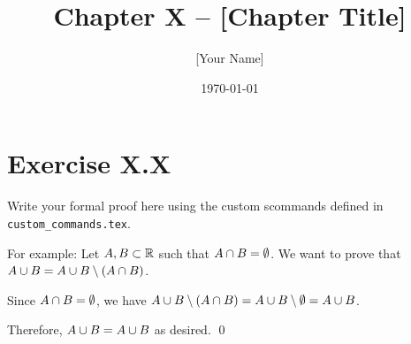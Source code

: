 \documentclass[11pt]{article}
\title{Chapter X -- [Chapter Title]}
\author{[Your Name]}
\date{\today}
\begin{document}
\maketitle
\thispagestyle{empty} %



\section*{Exercise X.X}




%     
%     
%     

\begin{solution}
    Write your formal proof here using the custom scommands defined in \texttt{custom\_commands.tex}.
    
    For example: Let $A, B \subset \mathbb{R}$ such that $A \cap B = \emptyset$. 
    We want to prove that $A \cup B = A \cup B \setminus (A \cap B)$.
    
    Since $A \cap B = \emptyset$, we have $A \cup B \setminus (A \cap B) = A \cup B \setminus \emptyset = A \cup B$.
    
    Therefore, $A \cup B = A \cup B$ as desired. \qed
\end{solution}
\end{document}
